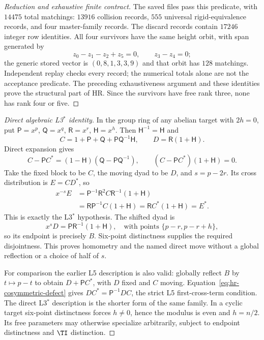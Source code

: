 \begin{proof}[Reduction and exhaustive finite contract]
The saved files pass this predicate, with $14475$ total matchings:
$13916$ collision records, $555$ universal rigid-equivalence records,
and four master-family records. The discard records contain $17246$
integer row identities. All four survivors have the same height orbit,
with span generated by
\[
 z_0-z_1-z_2+z_5=0,\qquad z_3-z_4=0;
\]
the generic stored vector is $(0,8,1,3,3,9)$ and that orbit has $128$
matchings. Independent replay checks every record; the numerical totals
alone are not the acceptance predicate. The preceding exhaustiveness
argument and these identities prove the structural part of HR. Since
the survivors have free rank three, none has rank four or five.
\end{proof}

\begin{proof}[Direct algebraic L3$^*$ identity]
In the group ring of any abelian target with $2h=0$, put
$\mathsf P=x^p$, $\mathsf Q=x^q$, $\mathsf R=x^r$, $\mathsf H=x^h$.
Then $\mathsf H^{-1}=\mathsf H$ and
\[
 C=1+\mathsf P+\mathsf Q+\mathsf P\mathsf Q^{-1}\mathsf H,
 \qquad D=\mathsf R(1+\mathsf H).
\]
Direct expansion gives
\begin{equation}\label{eq:hr-cosymmetric-defect}
 C-\mathsf PC^*=(1-\mathsf H)
                    (\mathsf Q-\mathsf P\mathsf Q^{-1}),
 \qquad (C-\mathsf PC^*)(1+\mathsf H)=0.
\end{equation}
Take the fixed block to be $C$, the moving dyad to be $D$, and
$s=p-2r$. Its cross distribution is $E=CD^*$, so
\begin{align*}
 x^{-s}E
 &=\mathsf P^{-1}\mathsf R^2 C\mathsf R^{-1}(1+\mathsf H)\\
 &=\mathsf R\mathsf P^{-1}C(1+\mathsf H)
  =\mathsf R C^*(1+\mathsf H)=E^*.
\end{align*}
This is exactly the L3$^*$ hypothesis. The shifted dyad is
\[
 x^sD=\mathsf P\mathsf R^{-1}(1+\mathsf H),
 \quad\text{with points }\{p-r,p-r+h\},
\]
so its endpoint is precisely $B$. Six-point distinctness supplies the
required disjointness. This proves homometry and the named direct move
without a global reflection or a choice of half of $s$.

For comparison the earlier L5 description is also valid: globally reflect
$B$ by $t\mapsto p-t$ to obtain $D+\mathsf PC^*$, with $D$ fixed and
$C$ moving. Equation~\eqref{eq:hr-cosymmetric-defect} gives
$DC^*=\mathsf P^{-1}DC$, the strict L5 first-cross-term condition.
The direct L3$^*$ description is the shorter form of the same family.
In a cyclic target six-point distinctness forces $h\ne0$, hence the
modulus is even and $h=n/2$. Its free parameters may otherwise specialize
arbitrarily, subject to endpoint distinctness and $\TI$ distinction.
\end{proof}

